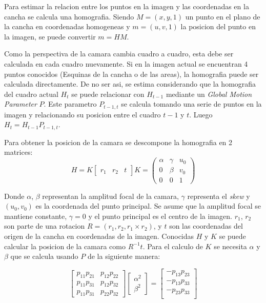 \documentclass[a4paper,10pt]{article}
\begin{document}
Para estimar la relacion entre los puntos en la imagen y las coordenadas en la cancha se calcula una homografia.
Siendo $M = (x, y, 1)$ un punto en el plano de la cancha en coordenadas homogeneas y $m = (u, v, 1)$ la posicion del punto en la imagen, se puede convertir $ m = H M $.

Como la perspectiva de la camara cambia cuadro a cuadro, esta debe ser calculada en cada cuadro nuevamente.
Si en la imagen actual se encuentran 4 puntos conocidos (Esquinas de la cancha o de las areas), la homografia puede ser calculada directamente.
De no ser asi, se estima considerando que la homografia del cuadro actual $H_t$ se puede relacionar con $H_{t-1}$ mediante un \textit{Global Motion Parameter} $P$.
Este parametro $P_{t-1,t}$ se calcula tomando una serie de puntos en la imagen y relacionando su posicion entre el cuadro $t-1$ y $t$.
Luego $ H_t = H_{t-1} P_{t-1,t}$.

Para obtener la posicion de la camara se descompone la homografia en 2 matrices:
\begin{equation}
H = K \begin{bmatrix} r_1 & r_2 & t \end{bmatrix}
K = \begin{pmatrix}
    \alpha & \gamma & u_0 \\
    0 & \beta & v_0 \\
    0 & 0 & 1
    \end{pmatrix}
\end{equation}

Donde $\alpha$, $\beta$ representan la amplitud focal de la camara, $\gamma$ representa el \textit{skew} y $(u_0, v_0)$ es la coordenada del punto principal.
Se asume que la amplitud focal se mantiene constante, $\gamma = 0$ y el punto principal es el centro de la imagen.
$r_1$, $r_2$ son parte de una rotacion $R = (r_1, r_2, r_1 \times r_2)$, y $t$ son las coordenadas del origen de la cancha en coordenadas de la imagen.
Conocidas $H$ y $K$ se puede calcular la posicion de la camara como $R^{-1} t$.
Para el calculo de $K$ se necesita $\alpha$ y $\beta$ que se calcula usando $P$ de la siguiente manera:

\begin{equation}
\begin{bmatrix}
    p_{1 1} p_{2 1} & p_{1 2} p_{2 2} \\
    p_{1 1} p_{3 1} & p_{1 2} p_{3 2} \\
    p_{1 1} p_{3 1} & p_{2 2} p_{3 2}
\end{bmatrix}
\begin{bmatrix}
    \alpha^2 \\
    \beta^2
\end{bmatrix}
 =
\begin{bmatrix}
    - p_{1 3} p_{2 3} \\
    - p_{1 3} p_{3 3} \\
    - p_{2 3} p_{3 3} \\
\end{bmatrix}
\end{equation}
\end{document}
